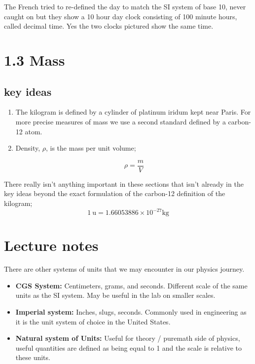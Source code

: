 \documentclass{article}
\begin{document}
The French tried to re-defined the day to match the SI system of base 10, never caught on but they show a 10 hour day clock consisting of 100 minute hours, called decimal time. Yes the two clocks pictured show the same time.

\section*{1.3 Mass}
\subsection*{key ideas}
\begin{enumerate}
	\item The kilogram is defined by a cylinder of platinum iridum kept near Paris. For more precise measures of mass we use a second standard defined by a carbon-12 atom.
	\item Density, $\rho$, is the mass per unit volume;

		\[
			\rho = \frac{m}{V}
		\]
\end{enumerate}

There really isn't anything important in these sections that isn't already in the key ideas beyond the exact formulation of the carbon-12 definition of the kilogram;
\[
	1\ \text{u} = 1.660 538 86 \times 10^{-27} \unit{\kilo\gram}
\]

\section*{Lecture notes}
There are other systems of units that we may encounter in our physics journey.
\begin{itemize}
	\item \textbf{CGS System:} Centimeters, grams, and seconds. Different scale of the same units as the SI system. May be useful in the lab on smaller scales.

	\item \textbf{Imperial system:} Inches, slugs, seconds. Commonly used in engineering as it is the unit system of choice in the United States.

	\item \textbf{Natural system of Units:} Useful for theory /  puremath side of physics, useful quantities are defined as being equal to 1 and the scale is relative to these units.
\end{itemize}
\end{document}
